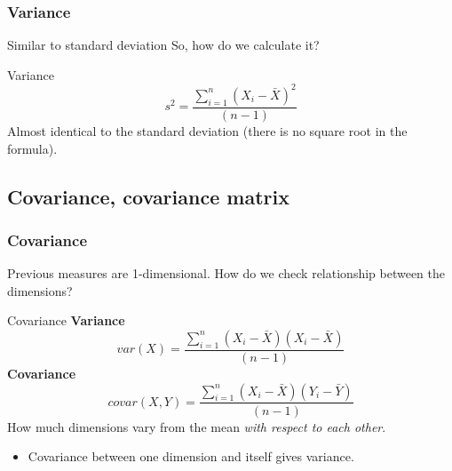 \documentclass{beamer}
\begin{document}
    \begin{frame}
        \frametitle{Variance}
        Similar to standard deviation
        \bigskip
        So, how do we calculate it?
        \begin{center}    
            \begin{block}{Variance}
                \begin{equation}    %
                    s^2 = \frac{\sum_{i=1}^n (X_i - \bar{X})^2}{(n-1)}
                \end{equation}
                Almost identical to the standard deviation (there is no square root in the formula).
            \end{block}
        \end{center}
    \end{frame}

    \subsection{Covariance, covariance matrix}
    \begin{frame}
        \frametitle{Covariance}
        Previous measures are 1-dimensional. How do we check relationship between the dimensions?
        \begin{center}    
            \begin{block}{Covariance}
                \textbf{Variance}
                \begin{equation}    %
                    var(X) = \frac{\sum_{i=1}^n (X_i - \bar{X})(X_i - \bar{X})}{(n-1)}
                \end{equation}
                \textbf{Covariance}
                \begin{equation}    %
                    covar(X,Y) = \frac{\sum_{i=1}^n (X_i - \bar{X})(Y_i - \bar{Y})}{(n-1)}
                \end{equation}
                How much dimensions vary from the mean \textit{with respect to each other}.
            \end{block}
        \end{center}
        \begin{itemize}
          \item Covariance between one dimension and itself gives variance.
        \end{itemize}
        
    \end{frame}
\end{document}
